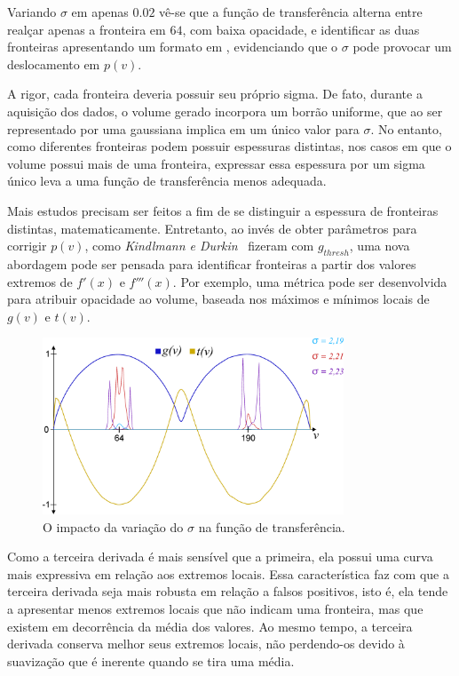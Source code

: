 	Variando $ \sigma $ em apenas $ 0.02 $ vê-se que a função de transferência alterna entre realçar apenas a fronteira em $ 64 $, com baixa opacidade, e identificar as duas fronteiras apresentando um formato em , evidenciando que o $ \sigma $ pode provocar um deslocamento em $ p(v) $.
	
	A rigor, cada fronteira deveria possuir seu próprio sigma. De fato, durante a aquisição dos dados, o volume gerado incorpora um borrão uniforme, que ao ser representado por uma gaussiana implica em um único valor para $ \sigma $. No entanto, como diferentes fronteiras podem possuir espessuras distintas, nos casos em que o volume possui mais de uma fronteira, expressar essa espessura por um sigma único leva a uma função de transferência menos adequada.
	
	Mais estudos precisam ser feitos a fim de se distinguir a espessura de fronteiras distintas, matematicamente. Entretanto, ao invés de obter parâmetros para corrigir $ p(v) $, como \textit{Kindlmann e Durkin}~\cite{gordon} fizeram com $ g_{thresh} $, uma nova abordagem pode ser pensada para identificar fronteiras a partir dos valores extremos de $ f'(x) $ e $ f'''(x) $. Por exemplo, uma métrica pode ser desenvolvida para atribuir opacidade ao volume, baseada nos máximos e mínimos locais de $ g(v) $ e $ t(v) $.
	
\begin{figure}
	\centering
	\includegraphics[width=0.8\textwidth]{images/m_sigma}
	\caption{O impacto da variação do $ \sigma $ na função de transferência.}
	\label{fig:m_sigma}
\end{figure}
	
	Como a terceira derivada é mais sensível que a primeira, ela possui uma curva mais expressiva em relação aos extremos locais. Essa característica faz com que a terceira derivada seja mais robusta em relação a falsos positivos, isto é, ela tende a apresentar menos extremos locais que não indicam uma fronteira, mas que existem em decorrência da média dos valores. Ao mesmo tempo, a terceira derivada conserva melhor seus extremos locais, não perdendo-os devido à suavização que é inerente quando se tira uma média.
	
